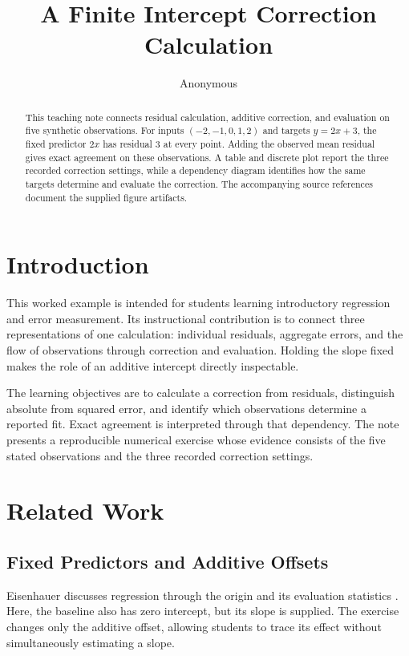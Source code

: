 \documentclass[11pt]{article}
\title{A Finite Intercept Correction Calculation}
\author{Anonymous}
\date{}
\begin{document}
\maketitle

\begin{abstract}
This teaching note connects residual calculation, additive correction, and evaluation on five synthetic observations. For inputs $(-2,-1,0,1,2)$ and targets $y=2x+3$, the fixed predictor $2x$ has residual $3$ at every point. Adding the observed mean residual gives exact agreement on these observations. A table and discrete plot report the three recorded correction settings, while a dependency diagram identifies how the same targets determine and evaluate the correction. The accompanying source references document the supplied figure artifacts.
\end{abstract}

\section{Introduction}

This worked example is intended for students learning introductory regression and error measurement. Its instructional contribution is to connect three representations of one calculation: individual residuals, aggregate errors, and the flow of observations through correction and evaluation. Holding the slope fixed makes the role of an additive intercept directly inspectable.

The learning objectives are to calculate a correction from residuals, distinguish absolute from squared error, and identify which observations determine a reported fit. Exact agreement is interpreted through that dependency. The note presents a reproducible numerical exercise whose evidence consists of the five stated observations and the three recorded correction settings.

\section{Related Work}

\subsection{Fixed Predictors and Additive Offsets}

Eisenhauer discusses regression through the origin and its evaluation statistics \cite{Eisenhauer2003RegressionThrough}. Here, the baseline also has zero intercept, but its slope is supplied. The exercise changes only the additive offset, allowing students to trace its effect without simultaneously estimating a slope.
\end{document}
